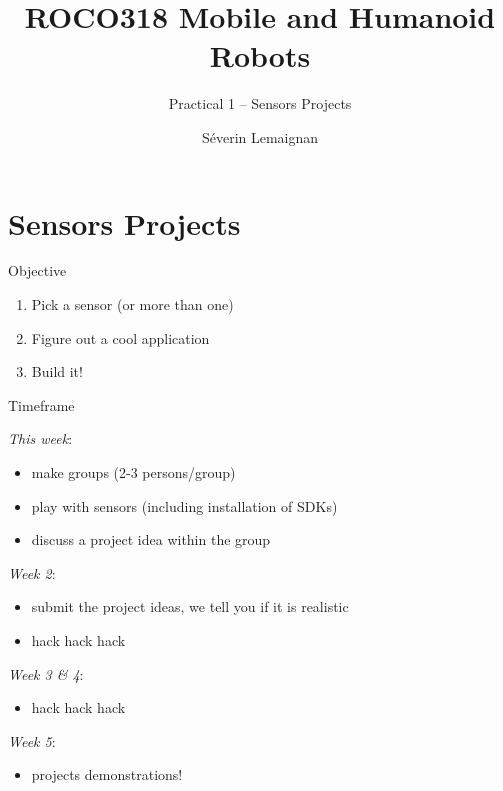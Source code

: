 \documentclass[compress]{beamer}
\title{ROCO318 \newline Mobile and Humanoid Robots}
\subtitle{Practical 1 -- Sensors Projects}
\date{}
\author{Séverin Lemaignan}
\institute{Centre for Neural Systems and Robotics\\{\bf Plymouth University}}
\providecommand{\tightlist}{%
  \setlength{\itemsep}{0pt}\setlength{\parskip}{0pt}}
\begin{document}

\maketitle

\section{Sensors Projects}\label{sensors-projects}

\begin{frame}{Objective}

\begin{enumerate}
\def\labelenumi{\arabic{enumi}.}
\tightlist
\item
  Pick a sensor (or more than one)
\item
  Figure out a cool application
\item
  Build it!
\end{enumerate}

\end{frame}


\begin{frame}{Timeframe}

\emph{This week}:

\begin{itemize}
\tightlist
\item
  make groups (2-3 persons/group)
\item
  play with sensors (including installation of SDKs)
\item
  discuss a project idea within the group
\end{itemize}

\emph{Week 2}:

\begin{itemize}
\tightlist
\item
  submit the project ideas, we tell you if it is realistic
\item
  hack hack hack
\end{itemize}

\emph{Week 3 \& 4}:

\begin{itemize}
\tightlist
\item
  hack hack hack
\end{itemize}

\emph{Week 5}:

\begin{itemize}
\tightlist
\item
  projects demonstrations!
\end{itemize}

\end{frame}
\end{document}
